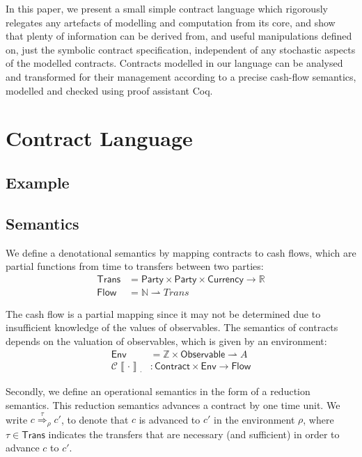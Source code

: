 \documentclass[a4paper,debug,twocolumn]{easychair}
\newcommand\type[1]{\mathsf{#1}}
\newcommand\reals{{\mathbb R}}
\newcommand\nats{{\mathbb N}}
\newcommand\ints{{\mathbb Z}}
\newcommand\pto{\rightharpoonup}
\newcommand\cSem[2]{{\mathcal C}\left\llbracket#1\right\rrbracket_{#2}}
\newcommand\cRed[2]{\stackrel{#2}\Rightarrow_{#1}}
\theoremstyle{plain}
\begin{document}
In this paper, we present a small simple contract language which rigorously
relegates any artefacts of modelling and computation from its core, and show
that plenty of information can be derived from, and useful manipulations defined
on, just the symbolic contract specification, independent of any stochastic
aspects of the modelled contracts.
Contracts modelled in our language can be analysed and transformed for their
management according to a precise cash-flow semantics, modelled and checked
using proof assistant Coq.

\section{Contract Language}
\label{sec:contract-language}

\subsection{Example}
\label{sec:example}

\subsection{Semantics}
\label{sec:semantics}

We define a denotational semantics by mapping contracts to cash flows,
which are partial functions from time to transfers between two
parties:
\begin{align*}
  \type{Trans} &= \type{Party} \times \type{Party} \times
  \type{Currency} \to \reals\\
  \type{Flow} &= \nats \pto Trans
\end{align*}

The cash flow is a partial mapping since it may not be determined due
to insufficient knowledge of the values of observables. The semantics
of contracts depends on the valuation of observables, which is given
by an environment:
\begin{align*}
  \type{Env} &= \ints \times \type{Observable} \pto A\\
  \cSem{\cdot}{\cdot}&\colon \type{Contract} \times \type{Env} \to
  \type{Flow}
\end{align*}

Secondly, we define an operational semantics in the form of a
reduction semantics. This reduction semantics advances a contract by
one time unit. We write $c \cRed \rho \tau c'$, to denote that $c$ is
advanced to $c'$ in the environment $\rho$, where $\tau \in
\type{Trans}$ indicates the transfers that are necessary (and
sufficient) in order to advance $c$ to $c'$.
\end{document}

